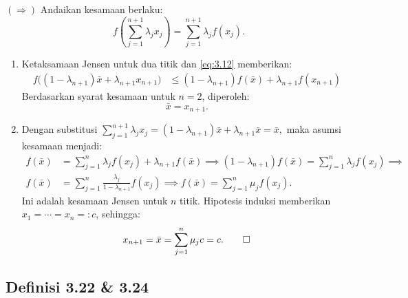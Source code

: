 \documentclass[aspectratio=169,11pt]{beamer}
\theoremstyle{definition}
\begin{document}
\begin{frame}[allowframebreaks]{\insertsection}{\insertsubsection}
  $(\Rightarrow)$ Andaikan kesamaan berlaku:
  \begin{equation*}
    f\left( \sum_{j=1}^{n+1} \lambda_j x_j \right) = \sum_{j=1}^{n+1} \lambda_j f(x_j).
  \end{equation*}
  \begin{enumerate}
    \item Ketaksamaan Jensen untuk dua titik dan \eqref{eq:3.12} memberikan:
          \begin{align*}
            f\bigl((1-\lambda_{n+1})\bar{x}+\lambda_{n+1}x_{n+1}\bigr)
             & \leq(1-\lambda_{n+1})f(\bar{x})+\lambda_{n+1}f(x_{n+1})
          \end{align*}
          Berdasarkan syarat kesamaan untuk $n=2$, diperoleh:
          \begin{equation*}
            \bar{x}=x_{n+1}.
          \end{equation*}

    \item Dengan substitusi
          $\displaystyle
            \sum_{j=1}^{n+1}\lambda_jx_j
            =(1-\lambda_{n+1})\bar{x}+\lambda_{n+1}\bar{x}=\bar{x},
          $
          maka asumsi kesamaan menjadi:
          \begin{align*}
            f(\bar{x}) & =\sum_{j=1}^n\lambda_jf(x_j)+\lambda_{n+1}f(\bar{x}) \implies
            (1-\lambda_{n+1})f(\bar{x}) =\sum_{j=1}^n\lambda_jf(x_j)\implies                   \\
            f(\bar{x}) & =\sum_{j=1}^n\frac{\lambda_j}{1-\lambda_{n+1}}f(x_j)         \implies
            f(\bar{x}) =\sum_{j=1}^n\mu_jf(x_j).
          \end{align*}
          Ini adalah kesamaan Jensen untuk $n$ titik. Hipotesis induksi memberikan $x_1=\cdots=x_n=:c$, sehingga:
          \begin{equation*}
            x_{n+1}=\bar{x}=\sum_{j=1}^n\mu_jc=c.\qed
          \end{equation*}
  \end{enumerate}
  \par\unskip %
\end{frame}

\subsection{Definisi 3.22 \& 3.24}
\end{document}
